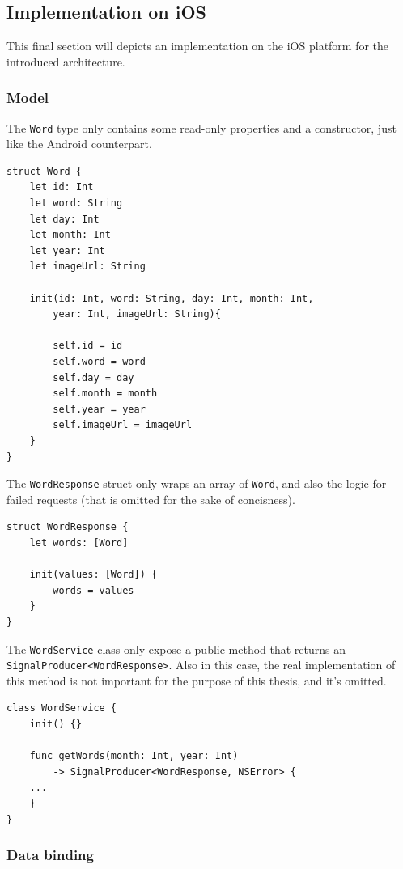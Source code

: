 \subsection{Implementation on iOS}\label{implementation-on-ios}

This final section will depicts an implementation on the iOS platform
for the introduced architecture.

\subsubsection{Model}\label{model}

The \texttt{Word} type only contains some read-only properties and a
constructor, just like the Android counterpart.

\begin{verbatim}
struct Word {
    let id: Int
    let word: String
    let day: Int
    let month: Int
    let year: Int
    let imageUrl: String

    init(id: Int, word: String, day: Int, month: Int,
        year: Int, imageUrl: String){

        self.id = id
        self.word = word
        self.day = day
        self.month = month
        self.year = year
        self.imageUrl = imageUrl
    }
}
\end{verbatim}

The \texttt{WordResponse} struct only wraps an array of \texttt{Word},
and also the logic for failed requests (that is omitted for the sake of
concisness).

\begin{verbatim}
struct WordResponse {
    let words: [Word]

    init(values: [Word]) {
        words = values
    }
}
\end{verbatim}

The \texttt{WordService} class only expose a public method that returns
an \texttt{SignalProducer\textless{}WordResponse\textgreater{}}. Also in
this case, the real implementation of this method is not important for
the purpose of this thesis, and it's omitted.

\begin{verbatim}
class WordService {
    init() {}

    func getWords(month: Int, year: Int)
        -> SignalProducer<WordResponse, NSError> {
    ...
    }
}
\end{verbatim}

\subsubsection{Data binding}\label{data-binding}

